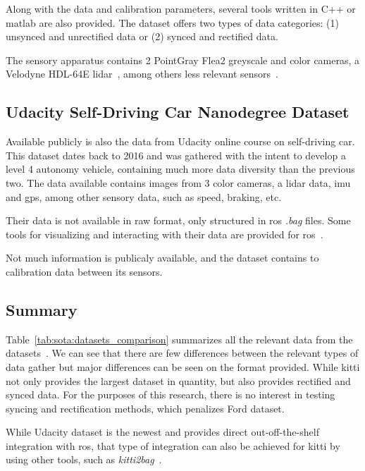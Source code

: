 Along with the data and calibration parameters, several tools written in C++ or \ac{matlab} are also provided. The dataset offers two types of data categories: (1) unsynced and unrectified data or (2) synced and rectified data. 

The sensory apparatus contains 2 PointGray Flea2 greyscale and color cameras, a Velodyne HDL-64E lidar~\cite{VelodyneHDL64}, among others less relevant sensors~\cite{Geiger2013a}.


\subsection{Udacity Self-Driving Car Nanodegree Dataset}
Available publicly is also the data from Udacity online course on self-driving car. This dataset dates back to 2016 and was gathered with the intent to develop a level 4 autonomy vehicle, containing much more data diversity than the previous two. The data available contains images from 3 color cameras, a \ac{lidar} data, \ac{imu} and \ac{gps}, among other sensory data, such as speed, braking, etc.

Their data is not available in raw format, only structured in \ac{ros} \textit{.bag} files. Some tools for visualizing and interacting with their data are provided for \ac{ros}~\cite{udacity}. 

Not much information is publicaly available, and the dataset contains to calibration data between its sensors.

\subsection{Summary}
Table~\ref{tab:sota:datasets_comparison} summarizes all the relevant data from the datasets~\cite{udacity, Pandey2011, Geiger2013a}. We can see that there are few differences between the relevant types of data gather but major differences can be seen on the format provided. While \ac{kitti} not only provides the largest dataset in quantity, but also provides rectified and synced data. For the purposes of this research, there is no interest in testing syncing and rectification methods, which penalizes Ford dataset. 

While Udacity dataset is the newest and provides direct out-off-the-shelf integration with \ac{ros}, that type of integration can also be achieved for \ac{kitti} by using other tools, such as \textit{kitti2bag}~\cite{TomasKrejci}. 
	

